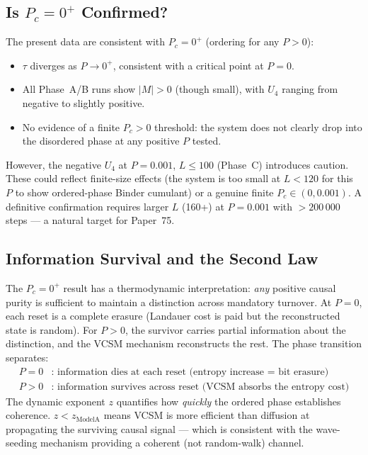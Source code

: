 \documentclass[12pt,a4paper]{article}
\begin{document}
\subsection{Is $P_c = 0^+$ Confirmed?}

The present data are consistent with $P_c = 0^+$ (ordering for any $P > 0$):
\begin{itemize}
  \item $\tau$ diverges as $P \to 0^+$, consistent with a critical point at $P=0$.
  \item All Phase~A/B runs show $|M| > 0$ (though small), with $U_4$ ranging from
        negative to slightly positive.
  \item No evidence of a finite $P_c > 0$ threshold: the system does not clearly drop
        into the disordered phase at any positive $P$ tested.
\end{itemize}
However, the negative $U_4$ at $P=0.001$, $L \leq 100$ (Phase~C) introduces caution.
These could reflect finite-size effects (the system is too small at $L<120$ for this
$P$ to show ordered-phase Binder cumulant) or a genuine finite $P_c \in (0, 0.001)$.
A definitive confirmation requires larger $L$ (160+) at $P=0.001$ with $>200\,000$ steps
--- a natural target for Paper~75.

\subsection{Information Survival and the Second Law}

The $P_c=0^+$ result has a thermodynamic interpretation: \emph{any} positive causal
purity is sufficient to maintain a distinction across mandatory turnover.  At $P=0$,
each reset is a complete erasure (Landauer cost is paid but the reconstructed state is
random).  For $P > 0$, the survivor carries partial information about the distinction,
and the VCSM mechanism reconstructs the rest.  The phase transition separates:
\begin{align*}
  P = 0 &: \text{ information dies at each reset (entropy increase = bit erasure)} \\
  P > 0 &: \text{ information survives across reset (VCSM absorbs the entropy cost)}
\end{align*}
The dynamic exponent $z$ quantifies how \emph{quickly} the ordered phase establishes
coherence.  $z < z_\mathrm{ModelA}$ means VCSM is more efficient than diffusion at
propagating the surviving causal signal --- which is consistent with the wave-seeding
mechanism providing a coherent (not random-walk) channel.
\end{document}
